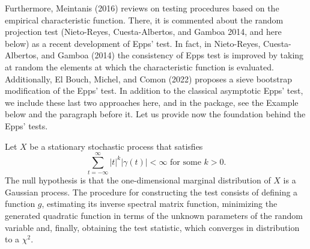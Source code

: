 Furthermore, Meintanis (2016) reviews on testing procedures based on the empirical characteristic function. There, it is commented about the random projection test (Nieto-Reyes, Cuesta-Albertos, and Gamboa 2014, and here below) as a recent development of Epps' test. In fact, in Nieto-Reyes, Cuesta-Albertos, and Gamboa (2014) the consistency of Epps test is improved by taking at random the elements at which the characteristic function is evaluated. Additionally, El Bouch, Michel, and Comon (2022) proposes a sieve bootstrap modification of the Epps' test. In addition to the classical asymptotic Epps' test, we include these last two approaches here, and in the package, see the Example below and the paragraph before it. Let us provide now the foundation behind the Epps' tests.

Let \(X\) be a stationary stochastic process that satisfies
\begin{equation}
  \sum_{t=-\infty}^{\infty}|t|^k|\gamma(t)| <\infty \mbox{ for some } k >0. \label{eq:a}
\end{equation}
The null hypothesis is that the one-dimensional marginal distribution of \(X\) is a Gaussian process. The procedure for constructing the test consists of defining a function \(g\), estimating its inverse spectral matrix function, minimizing the generated quadratic function in terms of the unknown parameters of the random variable and, finally, obtaining the test statistic, which converges in distribution to a \(\chi^2.\)

